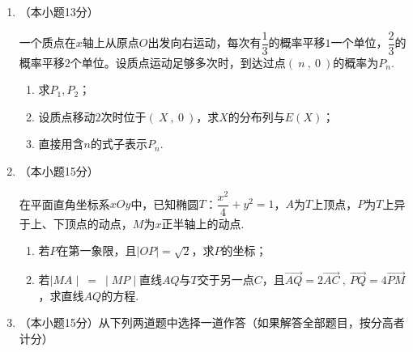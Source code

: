 \documentclass[11pt,a4paper]{ctexart}
\begin{document}
\begin{enumerate}[start=16]
 \begin{flushright}
    \end{flushright}

    \newpage
    \item （本小题13分）
    
    一个质点在$x$轴上从原点$O$出发向右运动，每次有$\dfrac{1}{3}$的概率平移$1$一个单位，$\dfrac{2}{3}$的概率平移$2$个单位。设质点运动足够多次时，到达过点$(\ n\ ,\ 0\ )$的概率为$P_n$.
    \begin{enumerate}[label=(\Roman*)]
        \item 求$P_1,P_2$；
        \item 设质点移动$2$次时位于$(\ X\ ,\ 0\ )$，求$X$的分布列与$E(X)$；
        \item 直接用含$n$的式子表示$P_n$.
    \end{enumerate}
    
    \vspace*{\fill}
    \item （本小题15分）
    
    在平面直角坐标系$xOy$中，已知椭圆$T$：$\dfrac{x^2}{4}+y^2=1$，$A$为$T$上顶点，$P$为$T$上异于上、下顶点的动点，$M$为$x$正半轴上的动点.
    \begin{enumerate}[label=(\Roman*)]
        \item 若$P$在第一象限，且$\mid OP \mid =\sqrt{2} $，求$P$的坐标；
        \item 若$\mid MA \mid \ =\ \mid MP \mid$直线$AQ$与$T$交于另一点$C$，且$\overrightarrow{AQ}=2\overrightarrow{AC}\ ,\ \overrightarrow{PQ}=4\overrightarrow{PM}$，求直线$AQ$的方程.
    \end{enumerate}
    \vspace*{\fill}

    \newpage
    \item （本小题15分）从下列两道题中选择一道作答（如果解答全部题目，按分高者计分）


\end{enumerate}
\end{document}
